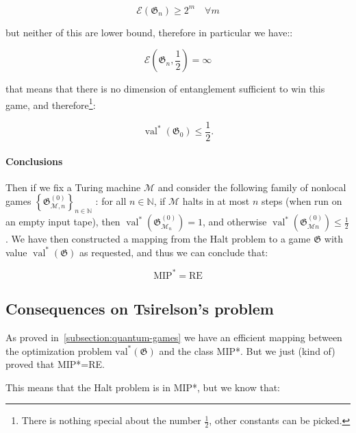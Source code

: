 \begin{equation}
    \mathscr{E}\left(\mathfrak{G}_{n}\right) \geq 2^m \quad \forall m
\end{equation}

but neither of this are lower bound, therefore in particular we have::

\begin{equation}
    \mathscr{E}\left(\mathfrak{G}_{n}, \frac{1}{2}\right) = \infty
\end{equation}

that means that there is no dimension of entanglement sufficient to win this game, and therefore\footnote{There is nothing special about the number $\frac{1}{2}$, other constants can be picked.}:

\begin{equation}
    \operatorname{val}^{*}(\mathfrak{G}_0) \leq \frac{1}{2}.
\end{equation}
\paragraph{Conclusions}
Then if we fix a Turing machine $\mathcal{M}$ and consider the following family of nonlocal games $\left\{\mathfrak{G}_{\mathcal{M}, n}^{(0)}\right\}_{n \in \mathbb{N}}$ : for all $n \in \mathbb{N}$, if $\mathcal{M}$ halts in at most $n$ steps (when run on an empty input tape), then $\operatorname{val}^{*}\left(\mathfrak{G}_{\mathcal{M}_{n}}^{(0)}\right)=1$, and otherwise $\operatorname{val}^{*}\left(\mathfrak{G}_{\mathcal{M} n}^{(0)}\right) \leq \frac{1}{2}$.
We have then constructed a mapping from the Halt problem to a game $\mathfrak{G}$ with value $\operatorname{val}^{*}(\mathfrak{G})$ as requested, and thus we can conclude that:
\begin{theorem}
\begin{equation}
\text{MIP}^{*} = \text{RE}
\end{equation}
\end{theorem}

\subsection{Consequences on Tsirelson's problem}
As proved in~\ref{subsection:quantum-games} we have an efficient mapping between the optimization problem $\operatorname{val^{*}}(\mathfrak{G})$ and the class MIP*. But we just (kind of) proved that MIP*=RE.

This means that the Halt problem is in MIP*, but we know that:

